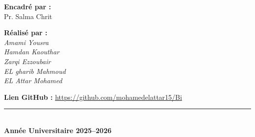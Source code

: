 \documentclass[12pt,a4paper,twoside]{report}
\begin{document}
\begin{titlepage}
  \vspace{0.45cm}


  \begin{tcolorbox}[
    colback=LightGray,
    colframe=MidGray!45,
    width=\linewidth,
    arc=4pt,
    boxrule=0.6pt,
    left=12pt,
    right=12pt,
    top=8pt,
    bottom=8pt
  ]
    \noindent
    \begin{minipage}[t]{0.48\linewidth}
      \textbf{\textcolor{PrimaryRed}{Encadré par :}}\\[0.15cm]
      Pr. Salma Chrit
    \end{minipage}
    \hfill
    \begin{minipage}[t]{0.48\linewidth}
      \raggedleft
      \textbf{\textcolor{PrimaryRed}{Réalisé par :}}\\[0.15cm]
      \textit{Amami Yousra}\\
      \textit{Hamdan Kaouthar}\\
      \textit{Zarqi Ezzoubair}\\
      \textit{EL gharib Mahmoud}\\
      \textit{EL Attar Mohamed}
    \end{minipage}
\end{tcolorbox}

\vspace{0.15cm}
\noindent
\textbf{\textcolor{PrimaryRed}{Lien GitHub :}} \href{https://github.com/mohamedelattar15/Bi}{https://github.com/mohamedelattar15/Bi}

  \vspace{0.35cm}



  \begin{center}
    \textcolor{PrimaryRed}{\rule{0.45\linewidth}{0.8pt}}\\[0.25cm]
    {\large\bfseries Année Universitaire 2025--2026}
  \end{center}
\end{titlepage}

\newpage
{}
\setcounter{page}{1}

\tableofcontents
\newpage

\listoffigures
\newpage

\listoftables
\newpage

\setcounter{page}{1}
\end{document}
